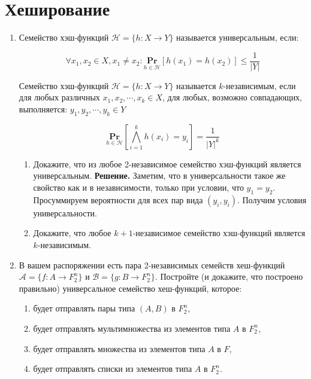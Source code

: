 \section*{Хеширование}
\begin{enumerate}
	\item Семейство хэш-функций $\mathcal{H} = \{h : X \rightarrow Y \}$ называется универсальным, если:
	
	\begin{equation*}
	\forall x_1, x_2 \in X, x_1 \neq x_2 : \underset{h \in \mathcal{H}}{\mathbf{Pr}} \left[h(x_1) = h(x_2)\right] 
	\leqslant \frac{1}{|Y|}
	\end{equation*}
	
	Семейство хэш-функций $\mathcal{H} = \{h : X \rightarrow Y \}$ называется $k$-независимым, если для любых 
	различных $x_1, x_2, \cdots , x_k \in X$, для любых, возможно совпадающих, выполняется: $y_1, y_2, \cdots, 
	y_k \in Y$
	
	\begin{equation*}
	 \underset{h \in \mathcal{H}}{\mathbf{Pr}} \left[\bigwedge\limits_{i = 1}^{k} h(x_i) = y_i\right] = 
	 \frac{1}{|Y|^k}
	\end{equation*}
		
	\begin{enumerate}
		\item Докажите, что из любое 2-независимое семейство хэш-функций является универсальным.
		\textbf{Решение.} Заметим, что в универсальности такое же свойство как и в независимости, только при 
		условии, что $y_1 = y_2$. Просуммируем вероятности для всех пар вида $(y_i, y_i)$. Получим условия 
		универсальности.
		
		\item Докажите, что любое $k + 1$-независимое семейство хэш-функций является $k$-независимым.
	\end{enumerate}
	
	
	\item В вашем распоряжении есть пара 2-независимых семейств хеш-функций $\mathcal{A} = \{f : A \rightarrow 
	F_2^n \}$ и $\mathcal{B} = \{g : B \rightarrow F_2^n \}$. Постройте (и докажите, что построено правильно) 
	универсальное семейство хеш-функций, которое:
	\begin{enumerate}
		\item будет отправлять пары типа $(A, B)$ в $F_2^n$,
		\item будет отправлять мультимножества из элементов типа $A$ в $F_2^n$,
		\item будет отправлять множества из элементов типа $A$ в $F$,
		\item будет отправлять списки из элементов типа $A$ в $F_2^n$.
	\end{enumerate}
	

\end{enumerate}
